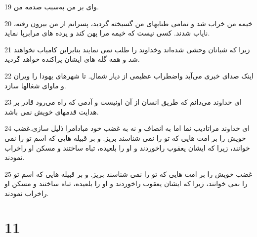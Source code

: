\par 19 وای بر من به‌سبب صدمه من.
\par 20 خیمه من خراب شد و تمامی طنابهای من گسیخته گردید، پسرانم از من بیرون رفته، نایاب شدند. کسی نیست که خیمه مرا پهن کند و پرده های مرابرپا نماید.
\par 21 زیرا که شبانان وحشی شده‌اند وخداوند را طلب نمی نمایند بنابراین کامیاب نخواهند شد و همه گله های ایشان پراکنده خواهد گردید.
\par 22 اینک صدای خبری می‌آید واضطراب عظیمی از دیار شمال. تا شهرهای یهودا را ویران و ماوای شغالها سازد.
\par 23 ‌ای خداوند می‌دانم که طریق انسان از آن اونیست و آدمی که راه می‌رود قادر بر هدایت قدمهای خویش نمی باشد.
\par 24 ‌ای خداوند مراتادیب نما اما به انصاف و نه به غضب خود مبادامرا ذلیل سازی.غضب خویش را بر امت هایی که تو را نمی شناسند بریز. و بر قبیله هایی که اسم تو را نمی خوانند، زیرا که ایشان یعقوب راخوردند و او را بلعیده، تباه ساختند و مسکن او راخراب نمودند.
\par 25 غضب خویش را بر امت هایی که تو را نمی شناسند بریز. و بر قبیله هایی که اسم تو را نمی خوانند، زیرا که ایشان یعقوب راخوردند و او را بلعیده، تباه ساختند و مسکن او راخراب نمودند.
 
\chapter{11}

